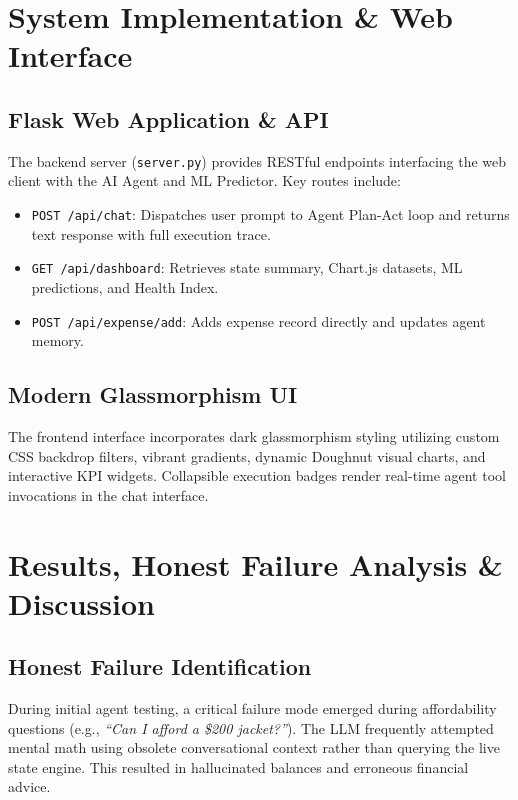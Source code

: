 \documentclass[12pt,a4paper,oneside]{report}
\begin{document}
\chapter{System Implementation \& Web Interface}
\label{chap:impl}

\section{Flask Web Application & API}
The backend server (\texttt{server.py}) provides RESTful endpoints interfacing the web client with the AI Agent and ML Predictor. Key routes include:
\begin{itemize}
    \item \texttt{POST /api/chat}: Dispatches user prompt to Agent Plan-Act loop and returns text response with full execution trace.
    \item \texttt{GET /api/dashboard}: Retrieves state summary, Chart.js datasets, ML predictions, and Health Index.
    \item \texttt{POST /api/expense/add}: Adds expense record directly and updates agent memory.
\end{itemize}

\section{Modern Glassmorphism UI}
The frontend interface incorporates dark glassmorphism styling utilizing custom CSS backdrop filters, vibrant gradients, dynamic Doughnut visual charts, and interactive KPI widgets. Collapsible execution badges render real-time agent tool invocations in the chat interface.

\chapter{Results, Honest Failure Analysis \& Discussion}
\label{chap:results}

\section{Honest Failure Identification}
During initial agent testing, a critical failure mode emerged during affordability questions (e.g., \textit{``Can I afford a \$200 jacket?''}). The LLM frequently attempted mental math using obsolete conversational context rather than querying the live state engine. This resulted in hallucinated balances and erroneous financial advice.
\end{document}
